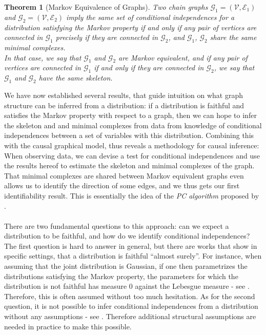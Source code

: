 \documentclass[11pt, a4paper]{memoir}
\theoremstyle{break}
\newtheorem{thm}{Theorem}
\theoremstyle{break}
\theoremstyle{nonumberplain}
\begin{document}
\begin{thm}[Markov Equivalence of Graphs]
Two chain graphs $\mathcal{G}_1=(\mathcal{V},\mathcal{E}_1)$ and $\mathcal{G}_2=(\mathcal{V},\mathcal{E}_2)$  imply the same set of conditional independences for a distribution satisfying the Markov property if and only if any pair of vertices are connected in $\mathcal{G}_1$ precisely if they are connected in $\mathcal{G}_2$, and $\mathcal{G}_1$, $\mathcal{G}_2$ share the same minimal complexes.\\[5pt]
In that case, we say that $\mathcal{G}_1$ and $\mathcal{G}_2$ are \emph{Markov equivalent}, and if any pair of vertices are connected in $\mathcal{G}_1$ if and only if they are connected in $\mathcal{G}_2$, we say that $\mathcal{G}_1$ and $\mathcal{G}_2$ have the same \emph{skeleton}.
\end{thm}
We have now established several results, that guide intuition on what graph structure can be inferred from a distribution: if a distribution is faithful and satisfies the Markov property with respect to a graph, then we can hope to infer the skeleton and and minimal complexes from data from knowledge of conditional independences between a set of variables with this distribution. Combining this with the causal graphical model, thus reveals a methodology for causal inference: 
When observing data, we can devise a test for conditional independences and use the results hereof to estimate the skeleton and minimal complexes of the graph. That minimal complexes are shared between Markov equivalent graphs even allows us to identify the direction of some edges, and we thus gets our first identifiability result. This is essentially the idea of the \emph{PC algorithm} proposed by \cite{PC}.\\\\
There are two fundamental questions to this approach: can we expect a distribution to be faithful, and how do we identify conditional independences? The first question is hard to answer in general, but there are works that show in specific settings, that a distribution is faithful \enquote{almost surely}. For instance, when assuming that the joint distribution is Gaussian, if one then parametrizes the distributions satisfying the Markov property, the parameters for which the distribution is not faithful has measure 0 against the Lebesgue measure - see \cite{Faithful1}. Therefore, this is often assumed without too much hesitation. As for the second question, it is not possible to infer conditional independences from a distribution without any assumptions - see \cite{CondIndTest}. Therefore additional structural assumptions are needed in practice to make this possible. 
\end{document}
